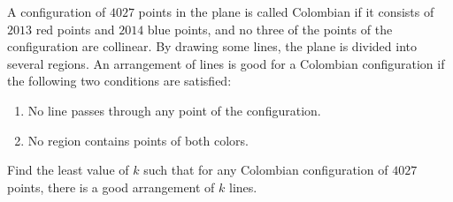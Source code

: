 A configuration of $4027$ points in the plane is called Colombian if it consists of $2013$ red points and $2014$ blue points, and no three of the points of the configuration are collinear.
By drawing some lines, the plane is divided into several regions.
An arrangement of lines is good for a Colombian configuration if the following two conditions are satisfied:

\begin{enumerate}[label = (\roman*)]
	\item No line passes through any point of the configuration.
	\item No region contains points of both colors.
\end{enumerate}

Find the least value of $k$ such that for any Colombian configuration of $4027$ points, there is a good arrangement of $k$ lines.
